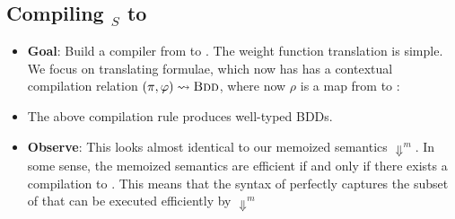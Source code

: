 \documentclass{tufte-handout}
\begin{document}
\subsection{Compiling \prop$_S$ to \bdd{}}
\begin{itemize}
  \item \textbf{Goal}: Build a compiler from \prop{} to \bdd{}. The weight function 
  translation is simple. We focus on translating formulae, which now has
  has a contextual compilation relation $(\pi, \varphi) \rightsquigarrow \textsc{Bdd}{}$, where 
  now $\rho$ is a map from \prop{} to \bdd{}:

  
  \item \begin{theorem}
    The above compilation rule produces well-typed BDDs.
  \end{theorem}
  
  \item \textbf{Observe}: This looks almost identical to our memoized semantics
  $\Downarrow^m$. In some sense, the memoized semantics are efficient if and
  only if there exists a compilation to \bdd{}. This means that the syntax of
  \bdd{} perfectly captures the subset of \prop{} that can be executed
  efficiently by $\Downarrow^m$


\end{itemize}
\end{document}
